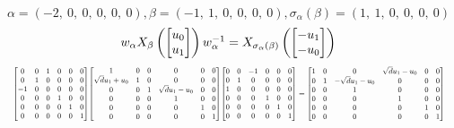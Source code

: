 \documentclass[11pt]{article}
\theoremstyle{definition}
\begin{document}
\[
\alpha = \left( -2, \  0, \  0, \  0, \  0, \  0\right), \beta = \left( -1, \  1, \  0, \  0, \  0, \  0\right), \sigma_{\alpha}(\beta) = \left( 1, \  1, \  0, \  0, \  0, \  0\right)
\]
\[
\scaletoalign{\textwidth}{w_{\alpha} X_{\beta}\left(\left[\begin{matrix}u_{0}\\u_{1}\end{matrix}\right]\right) w_{\alpha}^{-1} = X_{\sigma_{\alpha}\left(\beta\right)}\left(\left[\begin{matrix}- u_{1}\\- u_{0}\end{matrix}\right]\right)}
\]
\[
\scaletoalign{\textwidth}{{\left[\begin{matrix}0 & 0 & 1 & 0 & 0 & 0\\0 & 1 & 0 & 0 & 0 & 0\\-1 & 0 & 0 & 0 & 0 & 0\\0 & 0 & 0 & 1 & 0 & 0\\0 & 0 & 0 & 0 & 1 & 0\\0 & 0 & 0 & 0 & 0 & 1\end{matrix}\right]} {\left[\begin{matrix}1 & 0 & 0 & 0 & 0 & 0\\\sqrt{d} u_{1} + u_{0} & 1 & 0 & 0 & 0 & 0\\0 & 0 & 1 & \sqrt{d} u_{1} - u_{0} & 0 & 0\\0 & 0 & 0 & 1 & 0 & 0\\0 & 0 & 0 & 0 & 1 & 0\\0 & 0 & 0 & 0 & 0 & 1\end{matrix}\right]} {\left[\begin{matrix}0 & 0 & -1 & 0 & 0 & 0\\0 & 1 & 0 & 0 & 0 & 0\\1 & 0 & 0 & 0 & 0 & 0\\0 & 0 & 0 & 1 & 0 & 0\\0 & 0 & 0 & 0 & 1 & 0\\0 & 0 & 0 & 0 & 0 & 1\end{matrix}\right]} = {\left[\begin{matrix}1 & 0 & 0 & \sqrt{d} u_{1} - u_{0} & 0 & 0\\0 & 1 & - \sqrt{d} u_{1} - u_{0} & 0 & 0 & 0\\0 & 0 & 1 & 0 & 0 & 0\\0 & 0 & 0 & 1 & 0 & 0\\0 & 0 & 0 & 0 & 1 & 0\\0 & 0 & 0 & 0 & 0 & 1\end{matrix}\right]}}
\]
\end{document}
